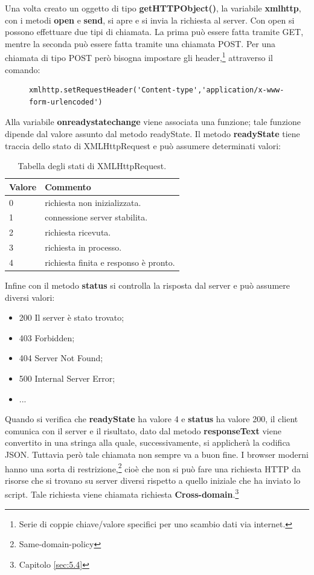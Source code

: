 \documentclass[a4paper,11pt]{article}
\begin{document}
Una volta creato un oggetto di tipo \textbf{getHTTPObject()}, la variabile \textbf{xmlhttp}, con i metodi \textbf{open} e \textbf{send}, si apre e si invia la richiesta al server.\newline
Con open si possono effettuare due tipi di chiamata. La prima può essere fatta tramite GET, mentre la seconda può essere fatta tramite una chiamata POST. Per una chiamata di tipo POST però bisogna impostare gli header,\footnote{Serie di coppie chiave/valore specifici per uno scambio dati via internet.} attraverso il comando:
\begin{figure}[htb]
\begin{lstlisting}[style=htmlcssjs]
xmlhttp.setRequestHeader('Content-type','application/x-www-form-urlencoded')
\end{lstlisting}
\end{figure}\newline
Alla variabile \textbf{onreadystatechange} viene associata una funzione; tale funzione dipende dal valore assunto dal metodo readyState.
Il metodo \textbf{readyState} tiene traccia dello stato di XMLHttpRequest e può assumere determinati valori:
\begin{table}[htb]
\begin{center}				
\begin{tabular}{|>{\small}l|>{\small}l|}
	\hline	\textbf{Valore} & \textbf{Commento}\\				
	\hline	0 & richiesta non inizializzata.\\
	\hline	1 & connessione server stabilita.\\
	\hline	2 & richiesta ricevuta.\\
	\hline	3 & richiesta in processo.\\
	\hline	4 & richiesta finita e responso è pronto.\\
	\hline			
\end{tabular}	
\caption{Tabella degli stati di XMLHttpRequest.}	
\end{center}	
\end{table}\newline
Infine con il metodo \textbf{status} si controlla la risposta dal server e può  assumere diversi valori:
\begin{itemize}
	\item 200 Il server è stato trovato;
	\item 403 Forbidden;
	\item 404 Server Not Found;
	\item 500 Internal Server Error;
	\item ...
\end{itemize}
Quando si verifica che \textbf{readyState} ha valore 4 e \textbf{status} ha valore 200, il client comunica con il server e il risultato, dato dal metodo \textbf{responseText} viene convertito in una stringa alla quale, successivamente, si applicherà la codifica JSON.
Tuttavia però tale chiamata non sempre va a buon fine. I browser moderni hanno una sorta di restrizione,\footnote{Same-domain-policy} cioè che non si può fare una richiesta HTTP da risorse che si trovano su server diversi rispetto a quello iniziale che ha inviato lo script.\newline
Tale richiesta viene chiamata richiesta \textbf{Cross-domain}.\footnote{Capitolo \ref{sec:5.4}}
\end{document}
